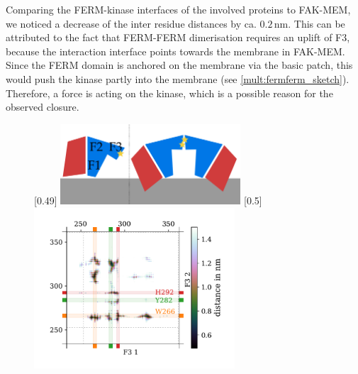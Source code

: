 Comparing the FERM-kinase interfaces of the involved proteins to FAK-MEM, we noticed a decrease of the inter residue distances by ca. $0.2\,\si{\nano\metre}$. This can be attributed to the fact that FERM-FERM dimerisation requires an uplift of F3, because the interaction interface points towards the membrane in FAK-MEM. Since the FERM domain is anchored on the membrane via the basic patch, this would push the kinase partly into the membrane (see \autoref{mult:fermferm_sketch}). Therefore, a force is acting on the kinase, which is a possible reason for the observed closure.
%
%
%
\begin{figure}[h]
	\subcaptionbox{\label{mult:fermferm_sketch}}[0.49\textwidth]{
		\includegraphics[height=3cm]{figures/results/fermfermdimer_sketch}
		\vspace{1.5cm}
	}\hfill%
	\subcaptionbox{\label{mult:fermfermcontact}}[0.5\textwidth]{
		\includegraphics[height=6cm]{figures/results/fermferminterface}
	}
	\label{mult:fermferm}
\end{figure}
%
%
%
